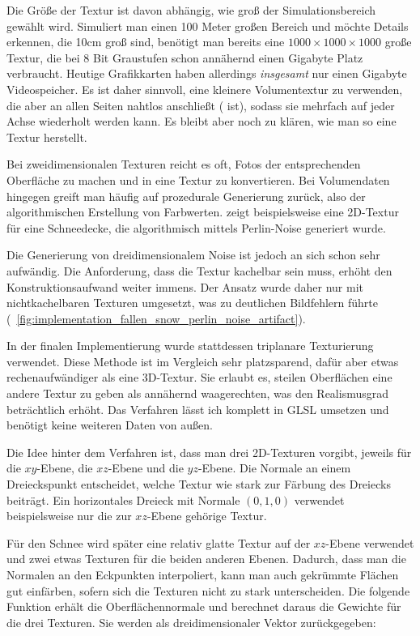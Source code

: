 Die Größe der Textur ist davon abhängig, wie groß der
Simulationsbereich gewählt wird. Simuliert man einen 100 Meter großen
Bereich und möchte Details erkennen, die 10cm groß sind, benötigt man
bereits eine $1000 \times 1000 \times 1000$ große Textur, die bei 8
Bit Graustufen schon annähernd einen Gigabyte Platz
verbraucht. Heutige Grafikkarten haben allerdings \emph{insgesamt} nur
einen Gigabyte Videospeicher. Es ist daher sinnvoll, eine kleinere
Volumentextur zu verwenden, die aber an allen Seiten nahtlos
anschließt ( ist), sodass sie mehrfach auf
jeder Achse wiederholt werden kann. Es bleibt aber noch zu klären, wie
man so eine Textur herstellt.

Bei zweidimensionalen Texturen reicht es oft, Fotos der entsprechenden
Oberfläche zu machen und in eine Textur zu konvertieren. Bei
Volumendaten hingegen greift man häufig auf prozedurale Generierung
zurück, also der algorithmischen Erstellung von
Farbwerten. 
zeigt beispielsweise eine 2D-Textur für eine Schneedecke, die
algorithmisch mittels Perlin-Noise\cite{Perlin:2002:IN:566654.566636}
generiert wurde.

Die Generierung von dreidimensionalem Noise ist jedoch an sich schon
sehr aufwändig. Die Anforderung, dass die Textur kachelbar sein muss,
erhöht den Konstruktionsaufwand weiter immens. Der Ansatz wurde daher
nur mit nichtkachelbaren Texturen umgesetzt, was zu deutlichen
Bildfehlern führte (\Pimiddyvgl\ \cref{fig:implementation_fallen_snow_perlin_noise_artifact}).

In der finalen Implementierung wurde stattdessen triplanare
Texturierung verwendet. Diese Methode ist im Vergleich sehr
platzsparend, dafür aber etwas rechenaufwändiger als eine
3D-Textur. Sie erlaubt es, steilen Oberflächen eine andere Textur zu
geben als annähernd waagerechten, was den Realismusgrad beträchtlich
erhöht. Das Verfahren lässt ich komplett in GLSL umsetzen und benötigt
keine weiteren Daten von außen.

Die Idee hinter dem Verfahren ist, dass man drei 2D-Texturen vorgibt,
jeweils für die $xy$-Ebene, die $xz$-Ebene und die $yz$-Ebene. Die
Normale an einem Dreieckspunkt entscheidet, welche Textur wie stark
zur Färbung des Dreiecks beiträgt. Ein horizontales Dreieck mit
Normale $(0,1,0)$ verwendet beispielsweise nur die zur $xz$-Ebene
gehörige Textur.

Für den Schnee wird später eine relativ glatte Textur auf der
$xz$-Ebene verwendet und zwei etwas  Texturen
für die beiden anderen Ebenen. Dadurch, dass man die Normalen an den
Eckpunkten interpoliert, kann man auch gekrümmte Flächen gut
einfärben, sofern sich die Texturen nicht zu stark unterscheiden. Die
folgende Funktion erhält die Oberflächennormale und berechnet daraus
die Gewichte für die drei Texturen. Sie werden als dreidimensionaler
Vektor zurückgegeben:

